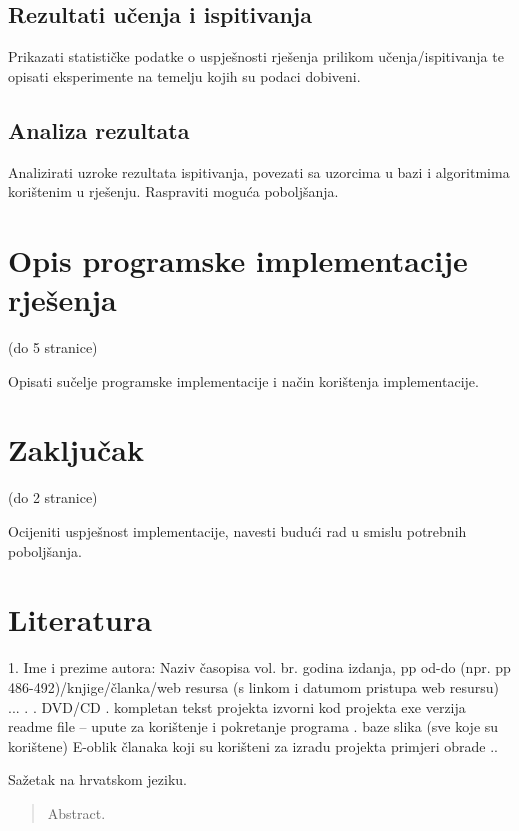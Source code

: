 \documentclass[times, utf8, diplomski]{fer}
\begin{document}
\section{Rezultati učenja i ispitivanja}

Prikazati statističke podatke o uspješnosti rješenja prilikom učenja/ispitivanja te opisati eksperimente na temelju kojih su podaci dobiveni.

\section{Analiza rezultata}

Analizirati uzroke rezultata ispitivanja, povezati sa uzorcima u bazi i algoritmima korištenim u rješenju. Raspraviti moguća poboljšanja.

\chapter{Opis programske implementacije rješenja}

(do 5 stranice)

Opisati sučelje programske implementacije i način korištenja implementacije.


\chapter{Zaključak}

(do 2 stranice)

Ocijeniti uspješnost implementacije, navesti budući rad u smislu potrebnih poboljšanja. 


\chapter{Literatura}

1. Ime i prezime autora: Naziv časopisa vol. br. godina izdanja, pp od-do (npr. pp 486-492)/knjige/članka/web resursa (s linkom i datumom pristupa web resursu)
...
.
.
DVD/CD  
.
kompletan tekst projekta
izvorni kod projekta
exe verzija
readme file – upute za korištenje i pokretanje programa
.
baze slika (sve koje su korištene)
E-oblik članaka koji su korišteni za izradu projekta
primjeri obrade
..






\begin{sazetak}
Sažetak na hrvatskom jeziku.

\end{sazetak}

\begin{abstract}
Abstract.

\end{abstract}
\end{document}
